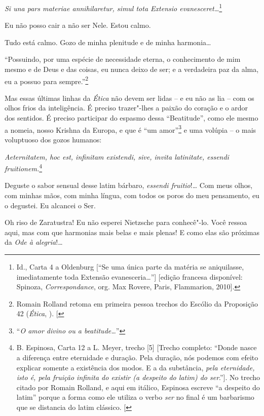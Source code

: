 \emph{Si una pars materiae annihilaretur, simul
tota Extensio evanesceret\ldots{}}\footnote{Id., Carta 4 a Oldenburg {[}``Se
  uma única parte da matéria se aniquilasse, imediatamente toda Extensão
  evanesceria\ldots{}''{]} {[}edição francesa disponível: Spinoza,
  \emph{Correspondance}, org. Max Rovere, Paris,  Flammarion, 2010{]}.}

Eu não posso cair a não ser Nele. Estou calmo.

Tudo está calmo. Gozo de minha plenitude e de minha harmonia\ldots{}

``Possuindo, por uma espécie de necessidade eterna, o conhecimento de
mim mesmo e de Deus e das coisas, eu nunca deixo de ser; e a verdadeira
paz da alma, eu a possuo para sempre.''\footnote{Romain Rolland retoma
  em primeira pessoa trechos do Escólio da Proposição 42 (\emph{Ética},
  ). {[}\versal{N.~T.}{]}}

Mas essas últimas linhas da \emph{Ética} não devem ser lidas -- e eu não
as lia -- com os olhos frios da inteligência. É preciso trazer"-lhes a
paixão do coração e o ardor dos sentidos. É preciso participar do
espasmo dessa ``Beatitude'', como ele mesmo a nomeia, nosso Krishna da
Europa, e que é ``um amor''\footnote{``\emph{O amor divino ou a
  beatitude\ldots{}}''} e uma volúpia -- o mais voluptuoso dos gozos humanos:

\emph{Aeternitatem, hoc est, infinitam existendi, sive, invita
latinitate, essendi fruitionem.}\footnote{B. Espinosa, Carta 12 a L.
  Meyer, trecho {[}5{]} {[}Trecho completo: ``Donde nasce a diferença
  entre eternidade e duração. Pela duração, nós podemos com efeito
  explicar somente a existência dos modos. E a da substância,
  \emph{pela eternidade, isto é, pela fruição infinita do existir (a
  despeito do latim) do ser}.''{]}. No trecho citado por Romain Rolland,
  e aqui em itálico, Espinosa escreve ``a despeito do latim'' porque a
  forma como ele utiliza o verbo \emph{ser} no final é um barbarismo que
  se distancia do latim clássico. {[}\versal{N.~T.}{]}}

Deguste o sabor sensual desse latim bárbaro, \emph{essendi fruitio}!\ldots{}
Com meus olhos, com minhas mãos, com minha língua, com todos os poros do
meu pensamento, eu o degustei. Eu alcancei o Ser.

Oh riso de Zaratustra! Eu não esperei Nietzsche para conhecê"-lo. Você
ressoa aqui, mas com que harmonias mais belas e mais plenas! E como elas
são próximas da \emph{Ode à alegria}!\ldots{}

